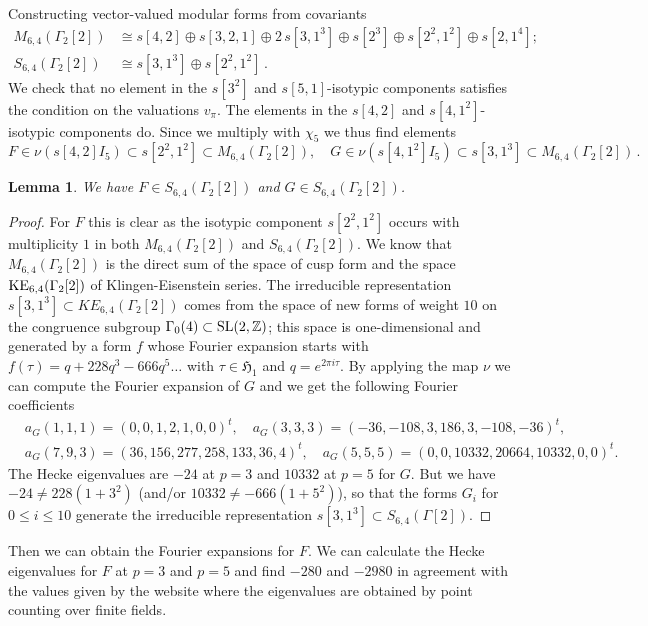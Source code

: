 \documentclass[12pt]{amsart}
\numberwithin{equation}{section}
\newcommand{\ZZ}{\mathbb Z}
\numberwithin{equation}{section}
\newtheorem{lemma}[theorem]{Lemma}
\theoremstyle{definition}
\theoremstyle{remark}
\begin{document}
\begin{section}{Constructing vector-valued modular forms from covariants}
\begin{align*}
M_{6,4}(\Gamma_2[2]) &\cong s[4, 2] \oplus  s[3, 2, 1] \oplus  2\,s[3, 1^3] \oplus  s[2^3] \oplus  s[2^2,1^2] \oplus  s[2,1^4];\\
S_{6,4}(\Gamma_2[2]) &\cong s[3, 1^3] \oplus  s[2^2,1^2]\, . 
\end{align*}
We check that no element in the $s[3^2]$ and $s[5,1]$-isotypic components satisfies the
condition on the valuations $v_{\pi}$. The elements in the $s[4,2]$ and $s[4,1^2]$-isotypic components do. Since we multiply with $\chi_5$ we thus find elements
$$
F \in \nu(s[4,2] I_5) \subset s[2^2,1^2] \subset M_{6,4}(\Gamma_2[2]), \quad
G \in  \nu(s[4,1^2] I_5)\subset s[3,1^3] \subset M_{6,4}(\Gamma_2[2])\, .
$$
\begin{lemma}
We have $F\in S_{6,4}(\Gamma_2[2])$ and $G \in S_{6,4}(\Gamma_2[2])$.
\end{lemma}
\begin{proof} For $F$ this is clear as the isotypic component $s[2^2,1^2]$ occurs with multiplicity $1$ in both $M_{6,4}(\Gamma_2[2])$
and $S_{6,4}(\Gamma_2[2])$. 
We know that $M_{6,4}(\Gamma_2[2])$ is the direct sum of the space of cusp form and the space 
${\rm KE}_{6,4}(\Gamma_2[2])$ of Klingen-Eisenstein series.
The irreducible representation $s[3,1^3]\subset KE_{6,4}(\Gamma_2[2])$ comes from the space 
of new forms of weight $10$ on the congruence subgroup $\Gamma_0(4)\subset {\rm SL}(2,\ZZ)$; 
this space is one-dimensional and generated by a form $f$ whose Fourier expansion starts with
$f(\tau)=q + 228q^3 - 666q^5\ldots $  with $\tau\in \mathfrak{H}_1$ and $q=e^{2\pi i \tau}$.
By applying the map $\nu$ we can compute the Fourier expansion of $G$ 
and we get the following Fourier coefficients 
\begin{align*}
& a_{G}(1,1,1) =(0,0,1,2,1,0,0)^t,\quad   a_{G}(3,3,3)=(-36, -108, 3, 186, 3, -108, -36)^t,\\
& a_{G}(7,9,3)=(36, 156, 277, 258, 133, 36, 4)^t, \quad a_{G}(5,5,5)=(0, 0, 10332, 20664, 10332, 0, 0)^t.
\end{align*}
The Hecke eigenvalues are $-24$ at $p=3$ and $10332$ at $p=5$ for $G$. But we have  $-24\neq 228(1+3^2)$  
(and/or $10332\neq -666(1+5^2)$), so that the forms $G_i$ for $0\leqslant i \leqslant 10$ generate the irreducible representation $s[3,1^3]\subset S_{6,4}(\Gamma[2])$.
\end{proof}

Then we can obtain the Fourier expansions for $F$. 
We can calculate the Hecke eigenvalues for $F$ at $p=3$ and $p=5$ and find
$-280$ and $-2980$ in agreement with the values given by the website \cite{website}
where the eigenvalues are obtained by point counting over finite fields.


\end{section}
\end{document}
